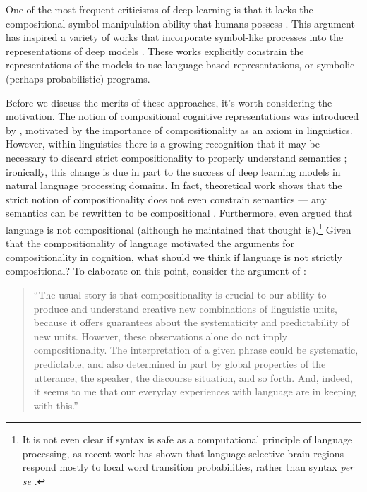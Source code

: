 One of the most frequent criticisms of deep learning is that it lacks the compositional symbol manipulation ability that humans possess \citep[][see also above]{Fodor1988, Lake2016,Lake2017,Marcus2018}. This argument has inspired a variety of works that incorporate symbol-like processes into the representations of deep models \citep[e.g.][]{Andreas2017,Mao2019}. These works explicitly constrain the representations of the models to use language-based representations, or symbolic (perhaps probabilistic) programs. \par 
Before we discuss the merits of these approaches, it's worth considering the motivation. The notion of compositional cognitive representations was introduced by \citet{Fodor1988}, motivated by the importance of compositionality as an axiom in linguistics. However, within linguistics there is a growing recognition that it may be necessary to discard strict compositionality to properly understand semantics \citep{Goldberg2015,Potts2019}; ironically, this change is due in part to the success of deep learning models in natural language processing domains. In fact, theoretical work shows that the strict notion of compositionality does not even constrain semantics --- any semantics can be rewritten to be compositional \citep{Zadrozny1992}. Furthermore, even \citet{Fodor2001} argued that language is not compositional (although he maintained that thought is).\footnote{It is not even clear if syntax is safe as a computational principle of language processing, as recent work has shown that language-selective brain regions respond mostly to local word transition probabilities, rather than syntax \emph{per se} \citep{Mollica2020}.} Given that the compositionality of language motivated the arguments for compositionality in cognition, what should we think if language is not strictly compositional? To elaborate on this point, consider the argument of \citet{Potts2019}:
\begin{quote}
``The usual story is that compositionality is crucial to our ability to produce and understand creative new combinations of linguistic units, because it offers guarantees about the systematicity and predictability of new units. However, these observations alone do not imply compositionality. The interpretation of a given phrase could be systematic, predictable, and also determined in part by global properties of the utterance, the speaker, the discourse situation, and so forth. And, indeed, it seems to me that our everyday experiences with language are in keeping with this.''
\end{quote}
